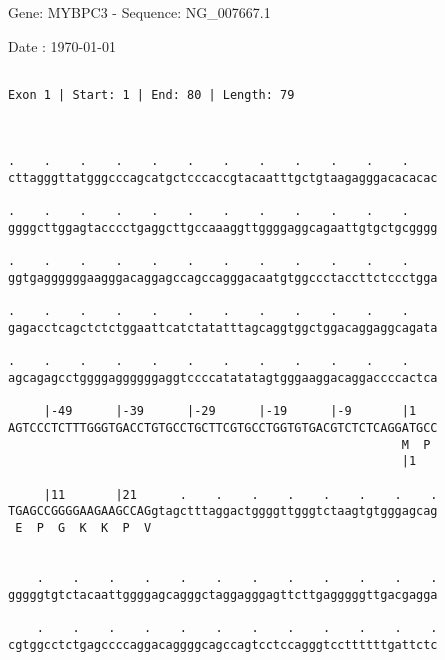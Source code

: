 \documentclass{article}
\begin{document}
\begin{center}
\begin{large}
 Gene: MYBPC3 - Sequence: NG\_007667.1
 
 Date : \today
\end{large}
\end{center}
 \begin{Verbatim}
 
Exon 1 | Start: 1 | End: 80 | Length: 79



.    .    .    .    .    .    .    .    .    .    .    .    
cttagggttatgggcccagcatgctcccaccgtacaatttgctgtaagagggacacacac
                                                            
.    .    .    .    .    .    .    .    .    .    .    .    
ggggcttggagtacccctgaggcttgccaaaggttggggaggcagaattgtgctgcgggg
                                                            
.    .    .    .    .    .    .    .    .    .    .    .    
ggtgaggggggaagggacaggagccagccagggacaatgtggccctaccttctccctgga
                                                            
.    .    .    .    .    .    .    .    .    .    .    .    
gagacctcagctctctggaattcatctatatttagcaggtggctggacaggaggcagata
                                                            
.    .    .    .    .    .    .    .    .    .    .    .    
agcagagcctggggaggggggaggtccccatatatagtgggaaggacaggaccccactca
                                                            
     |-49      |-39      |-29      |-19      |-9       |1   
AGTCCCTCTTTGGGTGACCTGTGCCTGCTTCGTGCCTGGTGTGACGTCTCTCAGGATGCC
                                                       M  P 
                                                       |1   
  
     |11       |21      .    .    .    .    .    .    .    .
TGAGCCGGGGAAGAAGCCAGgtagctttaggactggggttgggtctaagtgtgggagcag
 E  P  G  K  K  P  V                                        
                                                            
  
    .    .    .    .    .    .    .    .    .    .    .    .
gggggtgtctacaattggggagcagggctaggagggagttcttgagggggttgacgagga
                                                            
    .    .    .    .    .    .    .    .    .    .    .    .
cgtggcctctgagccccaggacaggggcagccagtcctccagggtccttttttgattctc
                                                            

\end{Verbatim}
\end{document}
